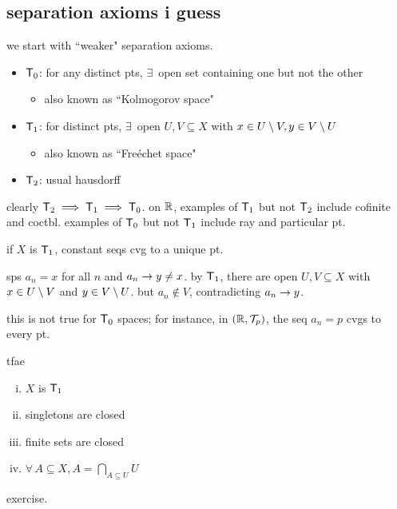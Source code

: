 \subsection{separation axioms i guess}


we start with ``weaker" separation axioms.
\begin{itemize}
    \item $\mathsf{T}_{0}$: for any distinct pts, $\exists \, $ open set containing
        one but not the other
        \begin{itemize}
            \item also known as ``Kolmogorov space"
        \end{itemize}
    \item $\mathsf{T}_{1}$: for distinct pts, $\exists \, $ open $U,V\subseteq X$
        with $x\in U\setminus V,y\in V\setminus U$
        \begin{itemize}
            \item also known as ``Fre\'echet space"
        \end{itemize}
    \item $\mathsf{T}_{2}$: usual hausdorff
\end{itemize}
clearly $\mathsf{T}_{2}\implies\mathsf{T}_{1}\implies\mathsf{T}_{0}$.
on $\mathbb{R}$, examples of $\mathsf{T}_{1}$ but not $\mathsf{T}_{2}$ include cofinite and
coctbl. examples of $\mathsf{T}_{0}$ but not $\mathsf{T}_{1}$ include ray and
particular pt.

\begin{prop}
    if $X$ is $\mathsf{T}_{1}$, constant seqs cvg to a unique pt.
\end{prop}

\begin{pf}[source=Primary Source Material]
    sps $a_{n}=x$ for all $n$ and $a_{n}\rightarrow y\neq x$.
    by $\mathsf{T}_{1}$, there are open $U,V\subseteq X$ with $x\in U\setminus V$ and
    $y\in V\setminus U$. but $a_{n}\notin V$, contradicting $a_{n}\rightarrow y$.
\end{pf}
this is not true for $\mathsf{T}_{0}$ spaces;
for instance, in $(\mathbb{R},\mathcal{T}_{p})$, the seq $a_{n}=p$ cvgs to every pt.

\newpage
\begin{prop}
    tfae
    \begin{enumerate}[i)]
        \item $X$ is $\mathsf{T}_{1}$
        \item singletons are closed
        \item finite sets are closed
        \item $\forall \, A\subseteq X,A=\displaystyle\bigcap_{A\subseteq U}U$
    \end{enumerate}
\end{prop}
exercise.

